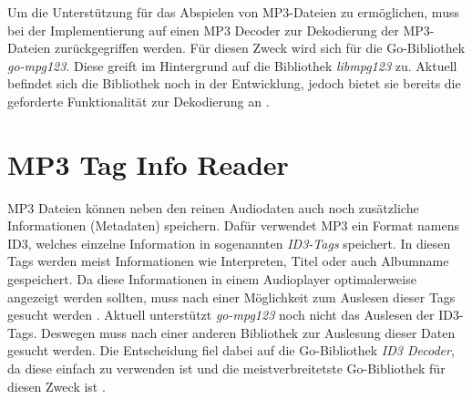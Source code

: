 Um die Unterstützung für das Abspielen von \ac{MP3}-Dateien zu ermöglichen,
muss bei der Implementierung auf einen \ac{MP3} Decoder zur Dekodierung
der \ac{MP3}-Dateien zurückgegriffen werden. Für diesen Zweck wird sich für die
Go-Bibliothek \textit{go-mpg123}. Diese greift im
Hintergrund auf die Bibliothek \textit{libmpg123} zu. Aktuell befindet sich die
Bibliothek noch in der Entwicklung, jedoch bietet sie bereits die
geforderte Funktionalität zur Dekodierung an \autocite{mp3_decoder}.

\section{MP3 Tag Info Reader}
\ac{MP3} Dateien können neben den reinen Audiodaten auch noch zusätzliche
Informationen (Metadaten) speichern. Dafür verwendet \ac{MP3} ein Format namens
\ac{ID3}, welches einzelne Information in
sogenannten \textit{\ac{ID3}-Tags} speichert. In diesen Tags werden meist
Informationen wie Interpreten, Titel oder auch Albumname gespeichert. Da diese
Informationen in einem Audioplayer optimalerweise angezeigt werden sollten,
muss nach einer Möglichkeit zum Auslesen dieser Tags gesucht werden \autocite{id3}. \hfill
\break
Aktuell unterstützt \textit{go-mpg123} noch nicht das Auslesen der \ac{ID3}-Tags.
Deswegen muss nach einer anderen Bibliothek zur Auslesung dieser Daten gesucht
werden. Die Entscheidung fiel dabei auf die Go-Bibliothek \textit{ID3 Decoder},
da diese einfach zu verwenden ist und die meistverbreitetste Go-Bibliothek
für diesen Zweck ist \autocite{id3_go_2015}.
